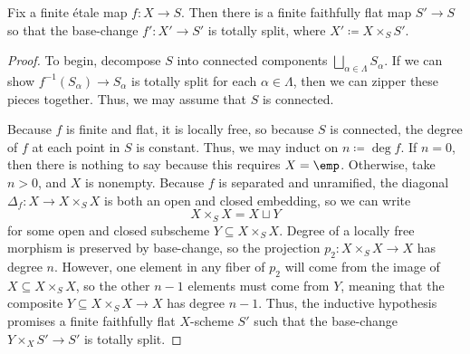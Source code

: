 \documentclass{amsart}
\begin{document}
\begin{proposition} \label{prop:finite-etale-is-locally-trivial}
    Fix a finite \'etale map $f\colon X\to S$. Then there is a finite faithfully flat map $S'\to S$ so that the base-change $f'\colon X'\to S'$ is totally split, where $X'\coloneqq X\times_SS'$.
\end{proposition}
\begin{proof}
    To begin, decompose $S$ into connected components $\bigsqcup_{\alpha\in\Lambda}S_\alpha$. If we can show $f^{-1}(S_\alpha)\to S_\alpha$ is totally split for each $\alpha\in\Lambda$, then we can zipper these pieces together. Thus, we may assume that $S$ is connected.

    Because $f$ is finite and flat, it is locally free, so because $S$ is connected, the degree of $f$ at each point in $S$ is constant. Thus, we may induct on $n\coloneqq\deg f$. If $n=0$, then there is nothing to say because this requires $X=\emp$. Otherwise, take $n>0$, and $X$ is nonempty. Because $f$ is separated and unramified, the diagonal $\Delta_f\colon X\to X\times_SX$ is both an open and closed embedding, so we can write
    \[X\times_SX=X\sqcup Y\]
    for some open and closed subscheme $Y\subseteq X\times_SX$. Degree of a locally free morphism is preserved by base-change,
    so the projection $p_2\colon X\times_SX\to X$ has degree $n$. However, one element in any fiber of $p_2$ will come from the image of $X\subseteq X\times_SX$, so the other $n-1$ elements must come from $Y$, meaning that the composite $Y\subseteq X\times_SX\to X$ has degree $n-1$. Thus, the inductive hypothesis promises a finite faithfully flat $X$-scheme $S'$ such that the base-change $Y\times_XS'\to S'$ is totally split.
    

\end{proof}
\end{document}
